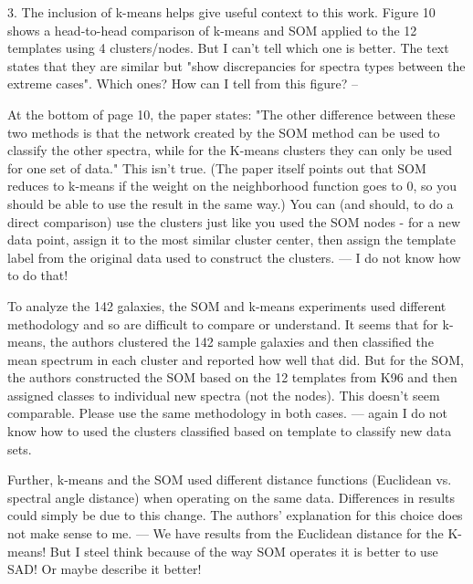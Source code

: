 3. The inclusion of k-means helps give useful context to this work. Figure 10 shows a head-to-head comparison of k-means and SOM applied to the 12 templates using 4 clusters/nodes.  But I can't tell which one is better.  The text states that they are similar but "show discrepancies for spectra types between the extreme cases".  Which ones?  How can I tell from this figure?
-- %

At the bottom of page 10, the paper states: "The other difference between these two methods is that the network created by the SOM method can be used to classify the other spectra, while for the K-means clusters they can only be used for one set of data."  This isn't true.  (The paper itself points out that SOM reduces to k-means if the weight on the neighborhood function goes to 0, so you should be able to use the result in the same way.)  You can (and should, to do a direct comparison) use the clusters just like you used the SOM nodes - for a new data point, assign it to the most similar cluster center, then assign the template label from the original data used to construct the clusters.
--- I do not know how to do that!

To analyze the 142 galaxies, the SOM and k-means experiments used different methodology and so are difficult to compare or understand. It seems that for k-means, the authors clustered the 142 sample galaxies and then classified the mean spectrum in each cluster and reported how well that did.  But for the SOM, the authors constructed the SOM based on the 12 templates from K96 and then assigned classes to individual new spectra (not the nodes).  This doesn't seem comparable.  Please use the same methodology in both cases.
--- again I do not know how to used the clusters classified based on template to classify new data sets.

Further, k-means and the SOM used different distance functions (Euclidean vs. spectral angle distance) when operating on the same data.  Differences in results could simply be due to this change.  The authors' explanation for this choice does not make sense to me.
--- We have results from the Euclidean distance for the K-means! But I steel think because of the way SOM operates it is better to use SAD! Or maybe describe it better!


